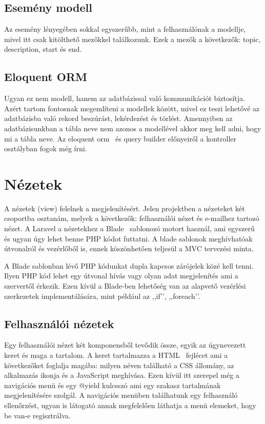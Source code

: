 \documentclass[
]{thesis-ekf}
\theoremstyle{definition}
\theoremstyle{remark}
\begin{document}
	\subsection{Esemény modell}
	Az esemény lényegében sokkal egyszerűbb, mint a felhasználónak a modellje, mivel itt csak kitölthető mezőkkel találkozunk. Ezek a mezők a következők: topic, description, start és end.
	
	\subsection{Eloquent ORM}
	Ugyan ez nem modell, hanem az adatbázissal való kommunikációt biztosítja. Azért tartom fontosnak megemlíteni a modellek között, mivel ez teszi lehetővé az adatbázisba való rekord beszúrást, lekérdezést és törlést. Amennyiben az adatbázisunkban a tábla neve nem azonos a modellével akkor meg kell adni, hogy mi a tábla neve. Az eloquent orm~\cite{laravel_eloquent} és query builder előnyeiről a kontroller osztályban fogok még írni.
	
	\section{Nézetek}
	A nézetek (view) felelnek a megjelenítésért. Jelen projektben a nézeteket két csoportba osztanám, melyek a következők: felhasználói nézet és e-mailhez tartozó nézet. A Laravel a nézetekhez a Blade~\cite{laravel_blade} sablonozó motort használ, ami egyszerű és ugyan úgy lehet benne PHP kódot futtatni. A blade sablonok meghívhatóak útvonalról és vezérlőből is, ennek köszönhetően teljesül a MVC tervezési minta. 
	
	A Blade sablonban lévő PHP kódunkat dupla kapcsos zárójelek közé kell tenni. Ilyen PHP kód lehet egy útvonal hívás vagy olyan adat megjelenítés ami a szervertől érkezik. Ezen kívül a Blade-ben lehetőség van az alapvető vezérlési szerkezetek implementálására, mint például az ,,if’’, ,,foreach’’.
	
	\subsection{Felhasználói nézetek}
	Egy felhasználói nézet két komponensből tevődik össze, egyik az úgynevezett keret és maga a tartalom. A keret tartalmazza a HTML~\cite{html_doc} fejlécet ami a következőket foglalja magába: milyen néven található a CSS állomány, az alkalmazás ikonja és a JavaScript meghívása. Ezen kívül itt szerepel még a navigációs menü és egy @yield kulcsszó ami egy szakasz tartalmának megjelenítésére szolgál. A navigációs menüben találhatunk egy felhasználó ellenőrzést, ugyan is látogató annak megfelelően láthatja a menü elemeket, hogy be van-e regisztrálva.
	
\end{document}
